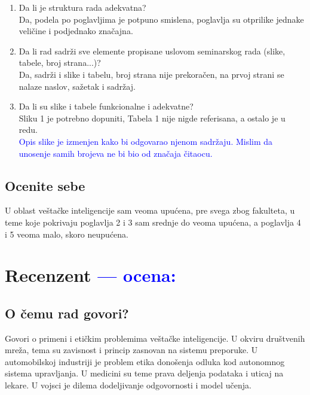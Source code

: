 \documentclass[a4paper]{report}
\newcommand{\odgovor}[1]{\textcolor{blue}{#1}}
\begin{document}
\begin{enumerate}
\item Da li je struktura rada adekvatna?\\
Da, podela po poglavljima je potpuno smislena, poglavlja su otprilike jednake veličine i podjednako značajna.

\item Da li rad sadrži sve elemente propisane uslovom seminarskog rada (slike, tabele, broj strana...)?\\
Da, sadrži i slike i tabelu, broj strana nije prekoračen, na prvoj strani se nalaze naslov, sažetak i sadržaj. 

\item Da li su slike i tabele funkcionalne i adekvatne?\\
Sliku 1 je potrebno dopuniti, Tabela 1 nije nigde referisana, a ostalo je u redu. \\
\odgovor{Opis slike je izmenjen kako bi odgovarao njenom sadržaju. Mislim da unosenje samih brojeva ne bi bio od značaja čitaocu.}
\end{enumerate}

\section{Ocenite sebe}
U oblast veštačke inteligencije sam veoma upućena, pre svega zbog fakulteta, u teme koje pokrivaju poglavlja 2 i 3 sam srednje do veoma upućena, a poglavlja 4 i 5 veoma malo, skoro neupućena. 


\chapter{Recenzent \odgovor{--- ocena:} }


\section{O čemu rad govori?}

Govori o primeni i etičkim problemima veštačke inteligencije. U okviru društvenih mreža, tema su zavisnost i princip zasnovan na sistemu preporuke. U automobilskoj industriji je problem etika donošenja odluka kod autonomnog sistema upravljanja. U medicini su teme prava deljenja podataka i uticaj na lekare. U vojsci je dilema dodeljivanje odgovornosti i model učenja.
\end{document}
